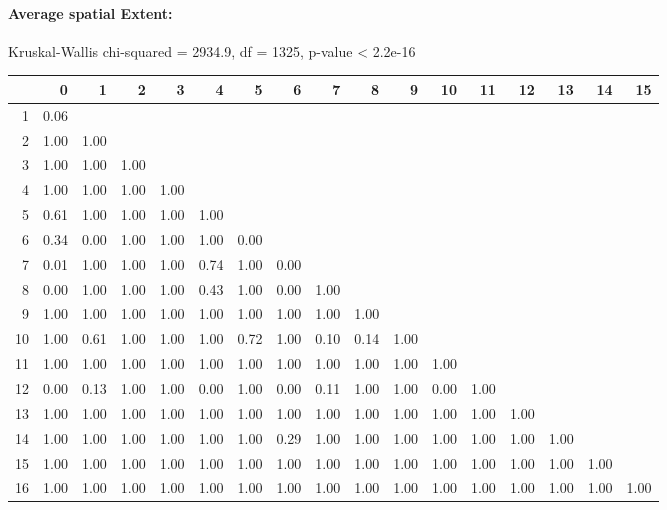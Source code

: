 \paragraph{Average spatial Extent:}
Kruskal-Wallis chi-squared = 2934.9, df = 1325, p-value < 2.2e-16

% 
\begin{tabular}{rrrrrrrrrrrrrrrrr}
  \hline
 & 0 & 1 & 2 & 3 & 4 & 5 & 6 & 7 & 8 & 9 & 10 & 11 & 12 & 13 & 14 & 15 \\ 
  \hline
1 & 0.06 &  &  &  &  &  &  &  &  &  &  &  &  &  &  &  \\ 
  2 & 1.00 & 1.00 &  &  &  &  &  &  &  &  &  &  &  &  &  &  \\ 
  3 & 1.00 & 1.00 & 1.00 &  &  &  &  &  &  &  &  &  &  &  &  &  \\ 
  4 & 1.00 & 1.00 & 1.00 & 1.00 &  &  &  &  &  &  &  &  &  &  &  &  \\ 
  5 & 0.61 & 1.00 & 1.00 & 1.00 & 1.00 &  &  &  &  &  &  &  &  &  &  &  \\ 
  6 & 0.34 & 0.00 & 1.00 & 1.00 & 1.00 & 0.00 &  &  &  &  &  &  &  &  &  &  \\ 
  7 & 0.01 & 1.00 & 1.00 & 1.00 & 0.74 & 1.00 & 0.00 &  &  &  &  &  &  &  &  &  \\ 
  8 & 0.00 & 1.00 & 1.00 & 1.00 & 0.43 & 1.00 & 0.00 & 1.00 &  &  &  &  &  &  &  &  \\ 
  9 & 1.00 & 1.00 & 1.00 & 1.00 & 1.00 & 1.00 & 1.00 & 1.00 & 1.00 &  &  &  &  &  &  &  \\ 
  10 & 1.00 & 0.61 & 1.00 & 1.00 & 1.00 & 0.72 & 1.00 & 0.10 & 0.14 & 1.00 &  &  &  &  &  &  \\ 
  11 & 1.00 & 1.00 & 1.00 & 1.00 & 1.00 & 1.00 & 1.00 & 1.00 & 1.00 & 1.00 & 1.00 &  &  &  &  &  \\ 
  12 & 0.00 & 0.13 & 1.00 & 1.00 & 0.00 & 1.00 & 0.00 & 0.11 & 1.00 & 1.00 & 0.00 & 1.00 &  &  &  &  \\ 
  13 & 1.00 & 1.00 & 1.00 & 1.00 & 1.00 & 1.00 & 1.00 & 1.00 & 1.00 & 1.00 & 1.00 & 1.00 & 1.00 &  &  &  \\ 
  14 & 1.00 & 1.00 & 1.00 & 1.00 & 1.00 & 1.00 & 0.29 & 1.00 & 1.00 & 1.00 & 1.00 & 1.00 & 1.00 & 1.00 &  &  \\ 
  15 & 1.00 & 1.00 & 1.00 & 1.00 & 1.00 & 1.00 & 1.00 & 1.00 & 1.00 & 1.00 & 1.00 & 1.00 & 1.00 & 1.00 & 1.00 &  \\ 
  16 & 1.00 & 1.00 & 1.00 & 1.00 & 1.00 & 1.00 & 1.00 & 1.00 & 1.00 & 1.00 & 1.00 & 1.00 & 1.00 & 1.00 & 1.00 & 1.00 \\ 
   \hline
\end{tabular}
